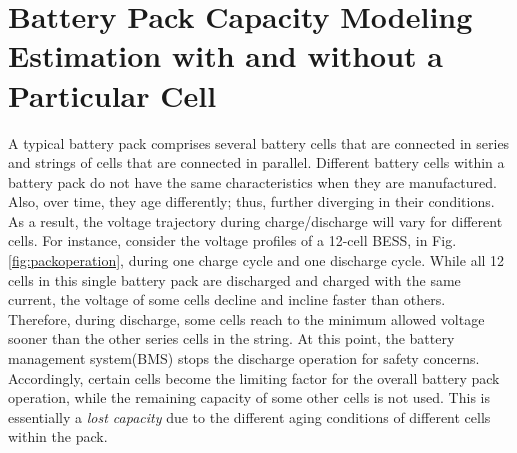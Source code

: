 \documentclass[10pt,twocolumn]{IEEEtran}
\begin{document}



\section{Battery Pack Capacity Modeling Estimation with and without a Particular Cell}

A typical battery pack comprises several battery  cells that are connected in series and strings of cells that are connected in parallel. 
Different battery  cells within a battery pack do not have the same characteristics when they are manufactured.
 Also, over time, they age differently; thus, further  diverging in their  conditions.
As a result,  the voltage trajectory during charge/discharge will vary for different cells.
For instance, consider the voltage profiles of a 12-cell BESS,   in Fig. \ref{fig:packoperation}, during one charge  cycle and one discharge cycle.
While all 12 cells in this single battery pack are discharged and charged with the same current, the voltage of some cells decline and incline faster than others.
%
%
Therefore, during discharge, some cells  reach to the minimum allowed voltage sooner than the other series cells in the  string.
At this point,  the battery management system(BMS) stops the discharge operation for safety concerns.
Accordingly, certain cells become the limiting factor for the overall  battery pack operation, 
while the remaining capacity of some other cells is not used. 
This is essentially a \emph{lost capacity} due to the different aging conditions of different cells within the pack. 
\end{document}
